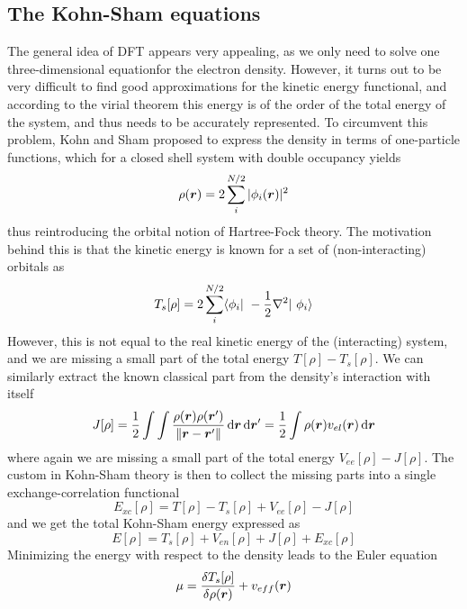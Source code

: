 \subsection{The Kohn-Sham equations}
The general idea of DFT appears very appealing, as we only need to solve one three-dimensional 
equationfor the electron density. However, it turns out to be very difficult to find good 
approximations for the kinetic energy functional, and according to the virial theorem this 
energy is of the order of the total energy of the system, and thus needs to be accurately 
represented. To circumvent this problem, Kohn and Sham\cite{Kohn-Sham:1965} proposed to express 
the density in terms of one-particle functions, which for a closed shell system with double 
occupancy yields
\begin{equation}
    \rho(\boldsymbol r) = 2 \sum_i^{N/2} | \phi_i(\boldsymbol r)|^2
\end{equation}
thus reintroducing the orbital notion of Hartree-Fock theory. The motivation behind this is 
that the kinetic energy is known for a set of (non-interacting) orbitals as
\begin{equation}
    T_s[\rho] = 2 \sum_i^{N/2} \langle \orbital_i | -\frac{1}{2}\nabla^2 | \orbital_i \rangle
\end{equation}
However, this is not equal to the real kinetic energy of the (interacting) system, and we are 
missing a small part of the total energy $T[\rho] - T_s[\rho]$. We can similarly extract the 
known classical part from the density's interaction with itself
\begin{equation}
    J[\rho] = \frac{1}{2}\int\int\frac{\rho(\boldsymbol r)\rho(\boldsymbol r')}{\|\boldsymbol r-\boldsymbol r'\|} \,\mathrm{d}\boldsymbol r\,\mathrm{d}\boldsymbol r' 
	= \frac{1}{2} \int \rho(\boldsymbol r)v_{el}(\boldsymbol r) \,\mathrm{d} \boldsymbol r
\end{equation}
where again we are missing a small part of the total energy $V_{ee}[\rho] - J[\rho]$. The custom 
in Kohn-Sham theory is then to collect the missing parts into a single exchange-correlation 
functional
\begin{equation}
    E_{xc}[\rho] = T[\rho] - T_s[\rho] + V_{ee}[\rho] - J[\rho]
\end{equation}
and we get the total Kohn-Sham energy expressed as
\begin{equation}
    \label{eq:KS-energy}
    E[\rho] = T_s[\rho] + V_{en}[\rho] + J[\rho] + E_{xc}[\rho]
\end{equation}
Minimizing the energy with respect to the density leads to the Euler equation
\begin{equation}
    \label{eq:KS-euler}
    \mu = \frac{\delta T_s[\rho]}{\delta \rho(\boldsymbol r)} + v_{eff}(\boldsymbol r)
\end{equation}

